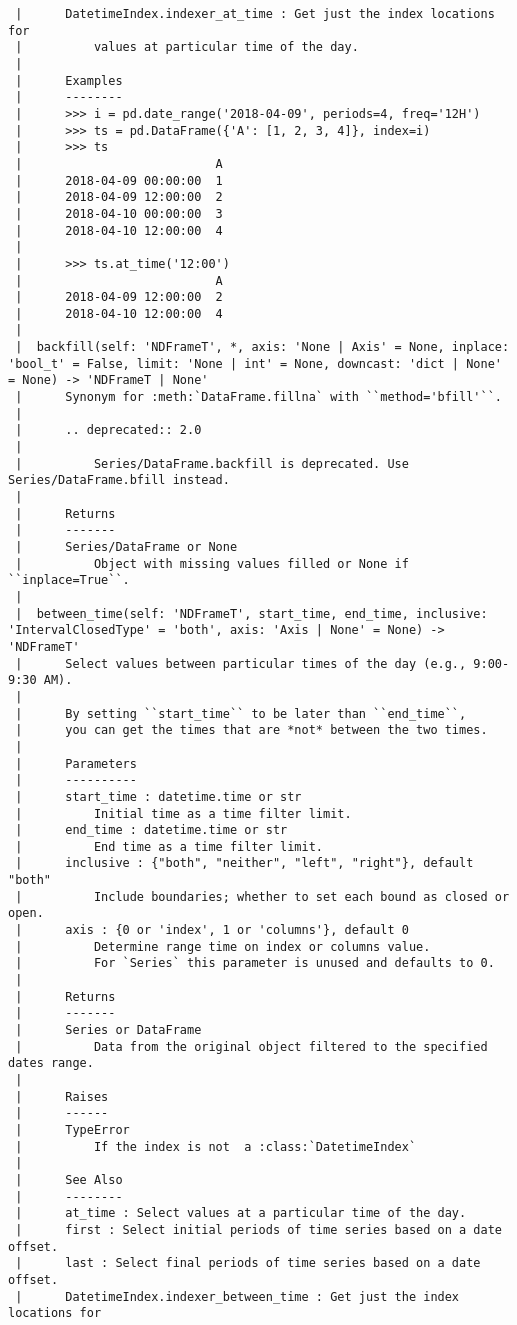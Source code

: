 \documentclass[
  letterpaper,
  DIV=11,
  numbers=noendperiod]{scrreprt}
\begin{document}
\begin{verbatim}
 |      DatetimeIndex.indexer_at_time : Get just the index locations for
 |          values at particular time of the day.
 |      
 |      Examples
 |      --------
 |      >>> i = pd.date_range('2018-04-09', periods=4, freq='12H')
 |      >>> ts = pd.DataFrame({'A': [1, 2, 3, 4]}, index=i)
 |      >>> ts
 |                           A
 |      2018-04-09 00:00:00  1
 |      2018-04-09 12:00:00  2
 |      2018-04-10 00:00:00  3
 |      2018-04-10 12:00:00  4
 |      
 |      >>> ts.at_time('12:00')
 |                           A
 |      2018-04-09 12:00:00  2
 |      2018-04-10 12:00:00  4
 |  
 |  backfill(self: 'NDFrameT', *, axis: 'None | Axis' = None, inplace: 'bool_t' = False, limit: 'None | int' = None, downcast: 'dict | None' = None) -> 'NDFrameT | None'
 |      Synonym for :meth:`DataFrame.fillna` with ``method='bfill'``.
 |      
 |      .. deprecated:: 2.0
 |      
 |          Series/DataFrame.backfill is deprecated. Use Series/DataFrame.bfill instead.
 |      
 |      Returns
 |      -------
 |      Series/DataFrame or None
 |          Object with missing values filled or None if ``inplace=True``.
 |  
 |  between_time(self: 'NDFrameT', start_time, end_time, inclusive: 'IntervalClosedType' = 'both', axis: 'Axis | None' = None) -> 'NDFrameT'
 |      Select values between particular times of the day (e.g., 9:00-9:30 AM).
 |      
 |      By setting ``start_time`` to be later than ``end_time``,
 |      you can get the times that are *not* between the two times.
 |      
 |      Parameters
 |      ----------
 |      start_time : datetime.time or str
 |          Initial time as a time filter limit.
 |      end_time : datetime.time or str
 |          End time as a time filter limit.
 |      inclusive : {"both", "neither", "left", "right"}, default "both"
 |          Include boundaries; whether to set each bound as closed or open.
 |      axis : {0 or 'index', 1 or 'columns'}, default 0
 |          Determine range time on index or columns value.
 |          For `Series` this parameter is unused and defaults to 0.
 |      
 |      Returns
 |      -------
 |      Series or DataFrame
 |          Data from the original object filtered to the specified dates range.
 |      
 |      Raises
 |      ------
 |      TypeError
 |          If the index is not  a :class:`DatetimeIndex`
 |      
 |      See Also
 |      --------
 |      at_time : Select values at a particular time of the day.
 |      first : Select initial periods of time series based on a date offset.
 |      last : Select final periods of time series based on a date offset.
 |      DatetimeIndex.indexer_between_time : Get just the index locations for

\end{verbatim}
\end{document}
